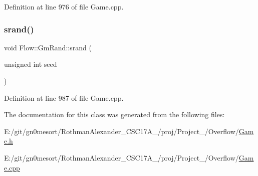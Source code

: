 Definition at line 976 of file Game.\+cpp.

\hypertarget{class_flow_1_1_gm_rand_abc8aefeb9e15a414964e6e9b0665a8e7}{}\label{class_flow_1_1_gm_rand_abc8aefeb9e15a414964e6e9b0665a8e7} 
\subsubsection{\texorpdfstring{srand()}{srand()}\hspace{0.1cm}{\footnotesize\ttfamily [2/2]}}
{\footnotesize\ttfamily void Flow\+::\+Gm\+Rand\+::srand (\begin{DoxyParamCaption}\item[{unsigned int}]{seed }\end{DoxyParamCaption})}



Definition at line 987 of file Game.\+cpp.



The documentation for this class was generated from the following files\+:\begin{DoxyCompactItemize}
\item 
E\+:/git/gn0mesort/\+Rothman\+Alexander\+\_\+\+C\+S\+C17\+A\+\_/proj/\+Project\+\_/\+Overflow/\hyperlink{_game_8h}{Game.\+h}\item 
E\+:/git/gn0mesort/\+Rothman\+Alexander\+\_\+\+C\+S\+C17\+A\+\_/proj/\+Project\+\_/\+Overflow/\hyperlink{_game_8cpp}{Game.\+cpp}\end{DoxyCompactItemize}
